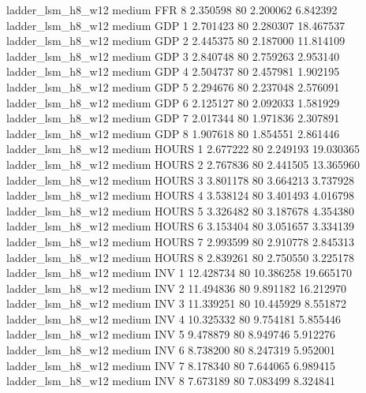   ladder_lsm_h8_w12     medium      FFR                 8  2.350598 80       2.200062           6.842392
  ladder_lsm_h8_w12     medium      GDP                 1  2.701423 80       2.280307          18.467537
  ladder_lsm_h8_w12     medium      GDP                 2  2.445375 80       2.187000          11.814109
  ladder_lsm_h8_w12     medium      GDP                 3  2.840748 80       2.759263           2.953140
  ladder_lsm_h8_w12     medium      GDP                 4  2.504737 80       2.457981           1.902195
  ladder_lsm_h8_w12     medium      GDP                 5  2.294676 80       2.237048           2.576091
  ladder_lsm_h8_w12     medium      GDP                 6  2.125127 80       2.092033           1.581929
  ladder_lsm_h8_w12     medium      GDP                 7  2.017344 80       1.971836           2.307891
  ladder_lsm_h8_w12     medium      GDP                 8  1.907618 80       1.854551           2.861446
  ladder_lsm_h8_w12     medium    HOURS                 1  2.677222 80       2.249193          19.030365
  ladder_lsm_h8_w12     medium    HOURS                 2  2.767836 80       2.441505          13.365960
  ladder_lsm_h8_w12     medium    HOURS                 3  3.801178 80       3.664213           3.737928
  ladder_lsm_h8_w12     medium    HOURS                 4  3.538124 80       3.401493           4.016798
  ladder_lsm_h8_w12     medium    HOURS                 5  3.326482 80       3.187678           4.354380
  ladder_lsm_h8_w12     medium    HOURS                 6  3.153404 80       3.051657           3.334139
  ladder_lsm_h8_w12     medium    HOURS                 7  2.993599 80       2.910778           2.845313
  ladder_lsm_h8_w12     medium    HOURS                 8  2.839261 80       2.750550           3.225178
  ladder_lsm_h8_w12     medium      INV                 1 12.428734 80      10.386258          19.665170
  ladder_lsm_h8_w12     medium      INV                 2 11.494836 80       9.891182          16.212970
  ladder_lsm_h8_w12     medium      INV                 3 11.339251 80      10.445929           8.551872
  ladder_lsm_h8_w12     medium      INV                 4 10.325332 80       9.754181           5.855446
  ladder_lsm_h8_w12     medium      INV                 5  9.478879 80       8.949746           5.912276
  ladder_lsm_h8_w12     medium      INV                 6  8.738200 80       8.247319           5.952001
  ladder_lsm_h8_w12     medium      INV                 7  8.178340 80       7.644065           6.989415
  ladder_lsm_h8_w12     medium      INV                 8  7.673189 80       7.083499           8.324841
